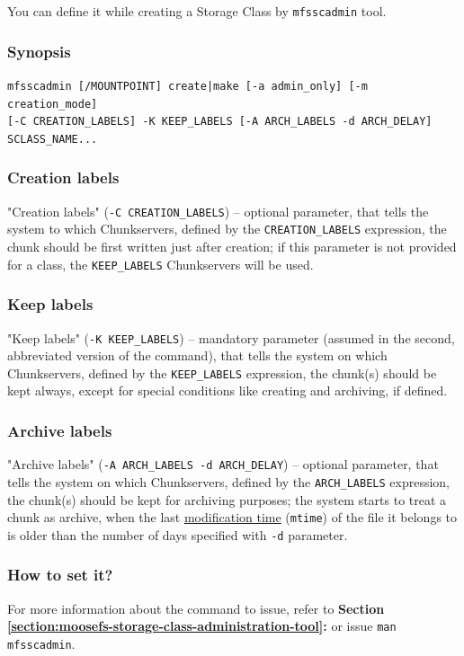 \documentclass[a4paper,11pt,english]{report}
\def\code#1{\texttt{#1}}
\begin{document}
			You can define it while creating a Storage Class by \code{mfsscadmin} tool.
			
				\subsubsection{Synopsis}
				\code{mfsscadmin [/MOUNTPOINT] create|make [-a admin\_only] [-m creation\_mode]} \\ \code{[-C CREATION\_LABELS] -K KEEP\_LABELS [-A ARCH\_LABELS -d ARCH\_DELAY] SCLASS\_NAME...}
			
				\subsubsection{Creation labels}
				"Creation labels" (\code{-C CREATION\_LABELS}) -- optional parameter, that tells the system to which Chunkservers, defined by the \code{CREATION\_LABELS} expression, the chunk should be first written just after creation; if this parameter is not provided for a class, the \code{KEEP\_LABELS} Chunkservers will be used.
			
			
				\subsubsection{Keep labels}
				"Keep labels" (\code{-K KEEP\_LABELS}) -- mandatory parameter (assumed in the second, abbreviated version of the command), that tells the system on which Chunkservers, defined by the \code{KEEP\_LABELS} expression, the chunk(s) should be kept always, except for special conditions like creating and archiving, if defined.
			
				\subsubsection{Archive labels}
				"Archive labels" (\code{-A ARCH\_LABELS -d ARCH\_DELAY}) -- optional parameter, that tells the system on which Chunkservers, defined by the \code{ARCH\_LABELS} expression, the chunk(s) should be kept for archiving purposes; the system starts to treat a chunk as archive, when the last \underline{modification time} (\code{mtime}) of the file it belongs to is older than the number of days specified with \code{-d} parameter.
				
				\subsubsection{How to set it?}
				For more information about the command to issue, refer to \textbf{Section \ref{section:moosefs-storage-class-administration-tool}:  } or issue \code{man mfsscadmin}.
				
\end{document}
